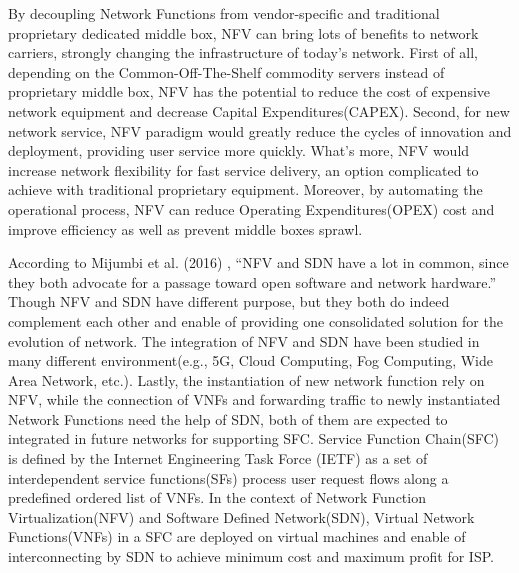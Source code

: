\documentclass{ieeeaccess}
\begin{document}
By decoupling Network Functions from vendor-specific and traditional proprietary dedicated middle box, NFV can bring lots of benefits to network carriers, strongly changing the infrastructure of today’s network. First of all, depending on the Common-Off-The-Shelf commodity servers instead of proprietary middle box, NFV has the potential to reduce the cost of expensive network equipment and decrease Capital Expenditures(CAPEX)\cite{b4}. Second, for new network service, NFV paradigm would greatly reduce the cycles of innovation and deployment, providing user service more quickly. What’s more, NFV would increase network flexibility for fast service delivery, an option complicated to achieve with traditional proprietary equipment\cite{b5}. Moreover, by automating the operational process, NFV can reduce Operating Expenditures(OPEX)\cite{b6} cost and improve efficiency as well as prevent middle boxes sprawl.

According to Mijumbi et al. (2016) \cite{b7}, ``NFV and SDN have a lot in common, since they both advocate for a passage toward open software and network hardware.'' Though NFV and SDN have different purpose, but they both do indeed complement each other and enable of providing one consolidated solution for the evolution of network. The integration of NFV and SDN have been studied in many different environment(e.g., 5G, Cloud Computing, Fog Computing, Wide Area Network, etc.). Lastly, the instantiation of new network function rely on NFV, while the connection of VNFs and forwarding traffic to newly instantiated Network Functions need the help of SDN, both of them are expected to integrated in future networks for supporting SFC. Service Function Chain(SFC)\cite{b9} is defined by the Internet Engineering Task Force (IETF) as a set of interdependent service functions(SFs) process user request flows along a predefined ordered list of VNFs. In the context of Network Function Virtualization(NFV) and Software Defined Network(SDN), Virtual Network Functions(VNFs) in a SFC are deployed on virtual machines and enable of interconnecting by SDN to achieve minimum cost and maximum profit for ISP.
\end{document}
